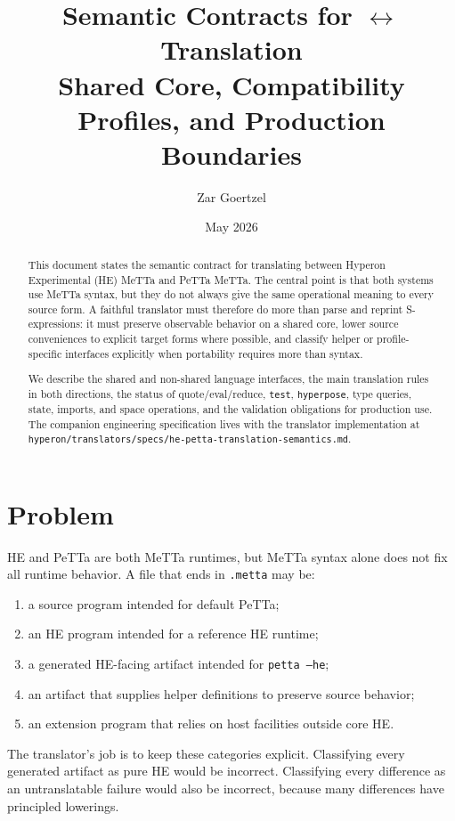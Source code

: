 \documentclass[11pt]{article}
\title{Semantic Contracts for \HE{} $\leftrightarrow$ \PeTTa{} Translation\\
\large Shared Core, Compatibility Profiles, and Production Boundaries}
\author{Zar Goertzel}
\date{May 2026}
\newcommand{\code}[1]{\texttt{#1}}
\newcommand{\HE}{\textup{HE}}
\newcommand{\PeTTa}{\textup{PeTTa}}
\begin{document}
\maketitle

\begin{abstract}
This document states the semantic contract for translating between Hyperon
Experimental (\HE{}) MeTTa and \PeTTa{} MeTTa.  The central point is that both
systems use MeTTa syntax, but they do not always give the same operational
meaning to every source form.  A faithful translator must therefore do more
than parse and reprint S-expressions: it must preserve observable behavior on a
shared core, lower source conveniences to explicit target forms where possible,
and classify helper or profile-specific interfaces explicitly when portability
requires more than syntax.

We describe the shared and non-shared language interfaces, the main translation
rules in both directions, the status of quote/eval/reduce, \code{test},
\code{hyperpose}, type queries, state, imports, and space operations, and the
validation obligations for production use.  The companion engineering
specification lives with the translator implementation at
\code{hyperon/translators/specs/he-petta-translation-semantics.md}.
\end{abstract}

\tableofcontents

\section{Problem}

\HE{} and \PeTTa{} are both MeTTa runtimes, but MeTTa syntax alone does not fix
all runtime behavior.  A file that ends in \code{.metta} may be:
\begin{enumerate}
\item a source program intended for default \PeTTa{};
\item an \HE{} program intended for a reference \HE{} runtime;
\item a generated \HE{}-facing artifact intended for \code{petta --he};
\item an artifact that supplies helper definitions to preserve source behavior;
\item an extension program that relies on host facilities outside core \HE{}.
\end{enumerate}

The translator's job is to keep these categories explicit.  Classifying every
generated artifact as pure \HE{} would be incorrect.  Classifying every
difference as an untranslatable failure would also be incorrect, because many
differences have principled lowerings.
\end{document}
